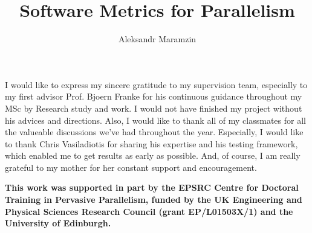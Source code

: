 \documentclass[mscres,icsa,logo,twoside]{infthesis}
\title{Software Metrics for Parallelism}
\author{Aleksandr Maramzin}
\theoremstyle{definition}
\begin{document}
\begin{preliminary}

\maketitle

\begin{acknowledgements}
\qquad I would like to express my sincere gratitude to my supervision team, especially to my first advisor Prof. Bjoern Franke for his continuous guidance throughout my MSc by Research study and work. I would not have finished my project without his advices and directions.\newline
\null\qquad Also, I would like to thank all of my classmates for all the valueable discussions we've had throughout the year. Especially, I would like to thank Chris Vasiladiotis for sharing his expertise and his testing framework, which enabled me to get results as early as possible.\newline
\null\qquad And, of course, I am really grateful to my mother for her constant support and encouragement.\newline

\null\quad \textbf{This work was supported in part by the EPSRC Centre for Doctoral Training in Pervasive Parallelism, funded by the UK Engineering and Physical Sciences Research Council (grant EP/L01503X/1) and the University of Edinburgh.}       
 
\end{acknowledgements}

\standarddeclaration


\tableofcontents


\end{preliminary}











\appendix







\end{document}

